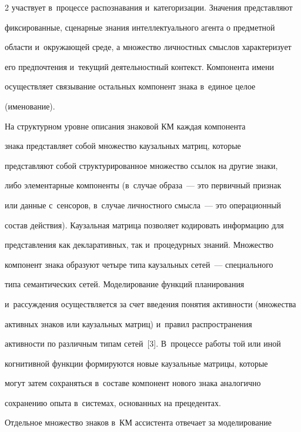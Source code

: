 \begin{multicols}{2}
участвует в~процессе распознавания и~категоризации. Значения представляют 


фиксированные, сценарные знания интеллектуального агента о предметной 


области и~окружающей среде, а множество личностных смыслов характеризует 


его предпочтения и~текущий деятельностный контекст. Компонента имени 


осуществляет связывание остальных компонент знака в~единое целое 


(именование).


  





  На структурном уровне описания знаковой КМ каждая компонента 


знака представляет собой множество каузальных матриц, которые 


представляют собой структурированное множество ссылок на другие знаки, 


либо элементарные компоненты (в~случае образа~--- это первичный признак 


или данные с~сенсоров, в~случае личностного смысла~--- это операционный 


состав действия). Каузальная матрица позволяет кодировать информацию для 


представления как декларативных, так и~процедурных знаний. Множество 


компонент знака образуют четыре типа каузальных сетей~--- специального 


типа семантических сетей. Моделирование функций планирования 


и~рассуждения осуществляется за счет введения понятия ак\-тив\-ности (множества 


активных знаков или каузальных матриц) и~правил распространения 


активности по различным типам сетей~[3]. В~процессе работы той или иной 


когнитивной функции формируются новые каузальные матрицы, которые 


могут затем сохраняться в~составе компонент нового знака аналогично 


сохранению опыта в~системах, основанных на прецедентах.


  


  Отдельное множество знаков в~КМ ассистента отвечает за моделирование 



\end{multicols}
